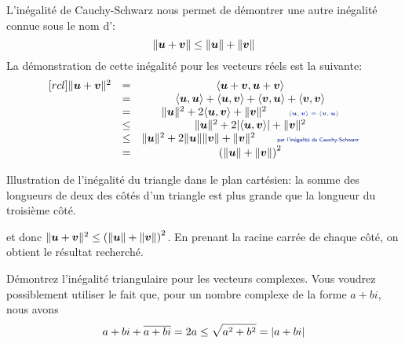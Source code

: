 L'inégalité de Cauchy-Schwarz nous permet de démontrer une autre inégalité connue sous le nom d':
\[
\lVert\boldsymbol{u} + \boldsymbol{v}\rVert \leq \lVert\boldsymbol{u}\rVert + \lVert\boldsymbol{v}\rVert
\]
La démonstration de cette inégalité pour les vecteurs réels est la suivante:
\[
\begin{matrix}[rcl]
\norm{\mat{u} + \mat{v}}^2 &=& \langle \mat{u} +\mat{v},\mat{u} + \mat{v} \rangle \\
&=& \langle \mat{u}, \mat{u} \rangle + \langle \mat{u}, \mat{v} \rangle + \langle \mat{v}, \mat{u} \rangle + \langle \mat{v}, \mat{v} \rangle\\
 &=& \norm{\mat{u}}^2 + 2\langle \mat{u}, \mat{v} \rangle + \norm{\mat{v}}^2 \qquad
 \explain{$\langle \mat{u}, \mat{v} \rangle = \langle \mat{v}, \mat{u} \rangle $}\\
&\leq& \norm{\mat{u}}^2 + 2\abs{\langle \mat{u}, \mat{v} \rangle} + \norm{\mat{v}}^2 \\
&\leq&  \norm{\mat{u}}^2 + 2\norm{\mat{u}}\norm{\mat{v}}+ \norm{\mat{v}}^2 \qquad \explain{par l'inégalité de Cauchy-Schwarz}\\
&=& \left( \norm{\mat{u}} + \norm{\mat{v}} \right)^2
\end{matrix}
\]
\begin{marginfigure}
\caption{Illustration de l'inégalité du triangle dans le plan cartésien: la somme des longueurs de deux 
des côtés d'un triangle est plus grande que la longueur du troisième côté.}
\end{marginfigure}
\noindent et donc $\lVert\boldsymbol{u} + \boldsymbol{v}\rVert^2 \leq  \left( \lVert\boldsymbol{u}\rVert + \lVert\boldsymbol{v}\rVert \right)^2$.
En prenant la racine carrée de chaque côté, on obtient le résultat recherché.

\begin{exerciceB}
Démontrez l'inégalité triangulaire pour les vecteurs complexes. 
Vous voudrez possiblement utiliser le fait que, pour un nombre complexe de la
forme $a+bi$, nous avons
\[
a+bi + \overline{a+bi} = 2a \leq \sqrt{a^2 + b^2} = \lvert a+bi\rvert
\]
\end{exerciceB}

